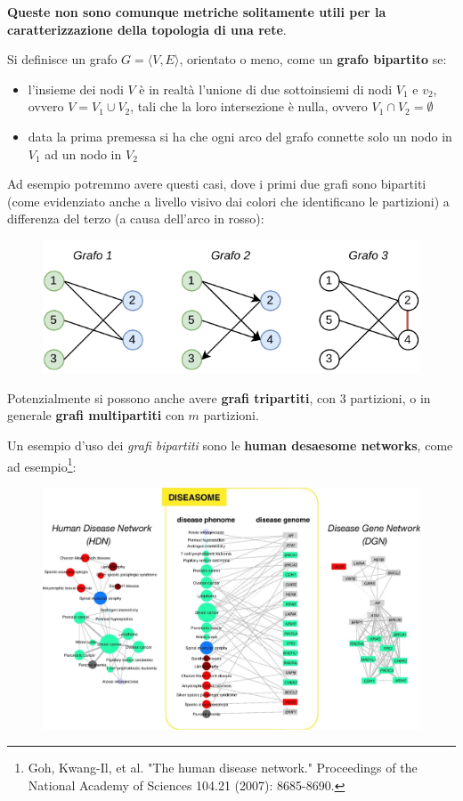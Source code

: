 \documentclass[a4paper,12pt, oneside]{book}
\begin{document}
\textbf{Queste non sono comunque metriche solitamente utili per la
  caratterizzazione della topologia di una rete}.
\begin{definizione}
  Si definisce un grafo $G=\langle V,E\rangle$, orientato o meno, come un
  \textbf{grafo bipartito} se:
  \begin{itemize}
    \item l'insieme dei nodi $V$ è in realtà l'unione di due sottoinsiemi di
    nodi $V_1$ e $v_2$, ovvero $V=V_1\cup V_2$, tali che la loro intersezione è
    nulla, ovvero $V_1\cap V_2=\emptyset$
    \item data la prima premessa si ha che ogni arco del grafo connette solo un
    nodo in $V_1$ ad un nodo in $V_2$
  \end{itemize}
  Ad esempio potremmo avere questi casi, dove i primi due grafi sono bipartiti
  (come evidenziato anche a livello visivo dai colori che identificano le
  partizioni) a differenza del terzo (a causa dell'arco in rosso):
  \begin{figure}[H]
    \centering
    \includegraphics[scale = 1.3]{img/bip.pdf}
  \end{figure}
  Potenzialmente si possono anche avere \textbf{grafi tripartiti}, con 3
  partizioni, o in generale \textbf{grafi multipartiti} con $m$ partizioni.
\end{definizione}
\newpage
Un esempio d'uso dei \textit{grafi bipartiti} sono le \textbf{human desaesome
  networks}, come ad esempio\footnote{Goh, Kwang-Il, et al. "The
  human disease network." Proceedings of the National Academy of Sciences 104.21
  (2007): 8685-8690.}:
\begin{figure}[H]
  \centering
  \includegraphics[scale = 0.7]{img/bi.jpg}
\end{figure}
\end{document}
